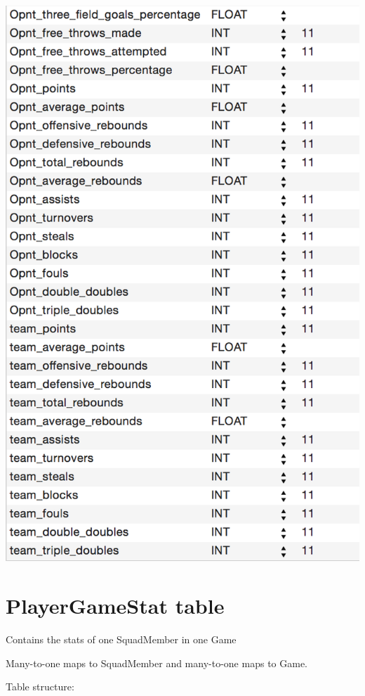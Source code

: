 \documentclass[letterpaper,10pt,english]{sphinxmanual}
\begin{document}
\includegraphics{SquadSeasonStat_table2.png}


\section{PlayerGameStat table}
\label{_static/database:playergamestat-table}
Contains the stats of one SquadMember in one Game

Many-to-one maps to SquadMember and many-to-one maps
to Game.

Table structure:
\end{document}
